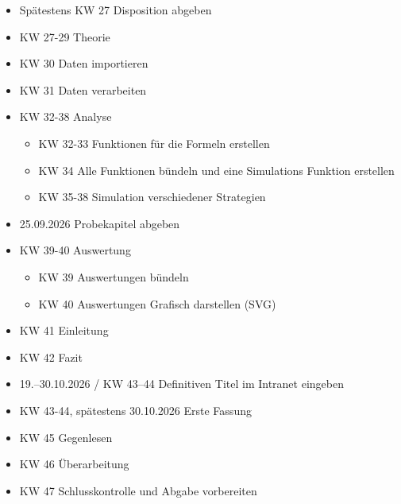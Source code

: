\documentclass[
  ngerman,
  a4paper,
  DIV=11,
  oneside]{scrreprt}
\providecommand{\tightlist}{%
  \setlength{\itemsep}{0pt}\setlength{\parskip}{0pt}}
\begin{document}
\begin{itemize}
\tightlist
\item[$\boxtimes$]
   Spätestens KW 27 Disposition abgeben
\item[$\square$]
   KW 27-29 Theorie
\item[$\square$]
   KW 30 Daten importieren
\item[$\square$]
   KW 31 Daten verarbeiten
\item[$\square$]
   KW 32-38 Analyse

  \begin{itemize}
  \tightlist
  \item[$\square$]
     KW 32-33 Funktionen für die Formeln erstellen
  \item[$\square$]
     KW 34 Alle Funktionen bündeln und eine
    Simulations Funktion erstellen
  \item[$\square$]
     KW 35-38 Simulation verschiedener Strategien
  \end{itemize}
\item[$\square$]
   25.09.2026 Probekapitel abgeben
\item[$\square$]
   KW 39-40 Auswertung

  \begin{itemize}
  \tightlist
  \item[$\square$]
     KW 39 Auswertungen bündeln
  \item[$\square$]
     KW 40 Auswertungen Grafisch darstellen (SVG)
  \end{itemize}
\item[$\square$]
   KW 41 Einleitung
\item[$\square$]
   KW 42 Fazit
\item[$\square$]
   19.--30.10.2026 / KW 43--44 Definitiven Titel im
  Intranet eingeben
\item[$\square$]
   KW 43-44, spätestens 30.10.2026 Erste Fassung
\item[$\square$]
   KW 45 Gegenlesen
\item[$\square$]
   KW 46 Überarbeitung
\item[$\square$]
   KW 47 Schlusskontrolle und Abgabe vorbereiten


\end{itemize}
\end{document}
